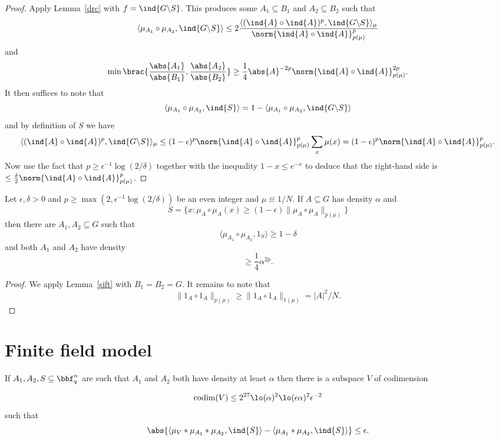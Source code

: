 \begin{proof}
\leanok
Apply Lemma~\ref{drc} with $f=\ind{G\backslash S}$. This produces some $A_1\subseteq B_1$ and $A_2\subseteq B_2$ such that
\[\langle \mu_{A_1}\circ \mu_{A_2}, \ind{G\backslash S}\rangle\leq 2\frac{\langle (\ind{A}\circ \ind{A})^p,\ind{G\backslash S}\rangle_\mu}{\norm{\ind{A}\circ \ind{A}}_{p(\mu)}^p}\]
and
\[\min\brac{\frac{\abs{A_1}}{\abs{B_1}},\frac{\abs{A_2}}{\abs{B_2}}}\geq \frac{1}{4}\abs{A}^{-2p}\norm{\ind{A}\circ \ind{A}}_{p(\mu)}^{2p}.\]
It then suffices to note that
\[\langle \mu_{A_1}\circ \mu_{A_2},\ind{S}\rangle=1-\langle \mu_{A_1}\circ \mu_{A_2},\ind{G\backslash S}\rangle\]
and by definition of $S$ we have
\[\langle (\ind{A}\circ \ind{A})^p,\ind{G\backslash S}\rangle_\mu\leq (1-\epsilon)^p\norm{\ind{A}\circ \ind{A}}_{p(\mu)}^p\sum_{x}\mu(x)=(1-\epsilon)^p\norm{\ind{A}\circ \ind{A}}_{p(\mu)}^p.\]
Now use the fact that $p\geq \epsilon^{-1}\log(2/\delta)$ together with the inequality $1-x\leq e^{-x}$ to deduce that the right-hand side is $\leq \tfrac{\delta}{2}\norm{\ind{A}\circ \ind{A}}_{p(\mu)}^p$.
\end{proof}


\begin{corollary}\label{sift_cor}
\leanok
Let $\epsilon,\delta>0$ and $p\geq \max(2,\epsilon^{-1}\log(2/\delta))$ be an even integer and $\mu\equiv 1/N$. If $A\subseteq G$ has density $\alpha$ and
\[S = \{ x : \mu_A\circ \mu_A(x) \geq (1-\epsilon)\| \mu_A\circ \mu_A\|_{p(\mu)}\}\]
then there are $A_1,A_2\subseteq G$ such that
\[\langle \mu_{A_1}\circ \mu_{A_2}, 1_S\rangle \geq 1-\delta\]
and both $A_1$ and $A_2$ have density
\[\geq \frac{1}{4}\alpha^{2p}.\]
\end{corollary}

\begin{proof}
\leanok
We apply Lemma~\ref{sift} with $B_1=B_2=G$. It remains to note that
\[\| 1_A\circ 1_A\|_{p(\mu)}\geq \| 1_A\circ 1_A\|_{1(\mu)}=\lvert A\rvert^2/N.\]
\end{proof}


\chapter{Finite field model}

\begin{theorem}
  \label{ap_in_ff}
\leanok
If $A_1,A_2,S\subseteq \bbf_q^n$ are such that $A_1$ and $A_2$ both have density at least $\alpha$ then there is a subspace $V$ of codimension

\[\mathrm{codim}(V)\leq 2^{27}\lo(\alpha)^2\lo(\epsilon \alpha)^2\epsilon^{-2}\]
such that
\[\abs{\langle \mu_V\ast \mu_{A_1}\ast \mu_{A_2},\ind{S}\rangle-\langle \mu_{A_1}\ast \mu_{A_2},\ind{S}\rangle}\leq \epsilon.\]
\end{theorem}

